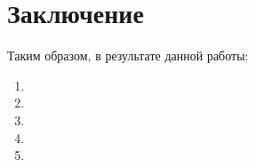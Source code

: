 \chapter*{Заключение}						%

Таким образом, в результате данной работы:
\begin{enumerate}
 
\item
    
\item 
    
\item 
    
\item 
  
\item 
\end{enumerate}


\clearpage